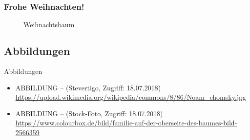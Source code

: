 \begin{frame}
\frametitle{Frohe Weihnachten!}

\begin{figure}
\centering
{}
\caption{Weihnachtsbaum}
\end{figure}

\end{frame}


\subsection{Abbildungen}
\begin{frame}{Abbildungen}
\small

\begin{itemize}
	\item ABBILDUNG --  (Stevertigo, Zugriff: 18.07.2018) \url{https://upload.wikimedia.org/wikipedia/commons/8/86/Noam_chomsky.jpg}
	\item ABBILDUNG --  (Stock-Foto, Zugriff: 18.07.2018) \url{https://www.colourbox.de/bild/familie-auf-der-oberseite-des-baumes-bild-2566359}
\end{itemize}	

\end{frame}